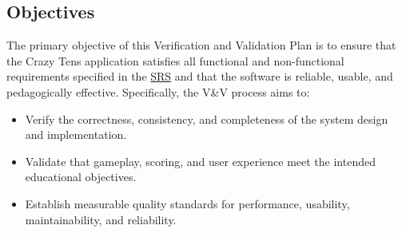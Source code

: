 \documentclass[12pt, titlepage]{article}
\begin{document}
\subsection{Objectives}

The primary objective of this Verification and Validation Plan is to ensure that the Crazy Tens application satisfies all functional and non-functional requirements specified in the \href{../SRS/SRS.pdf}{SRS} and that the software is reliable, usable, and pedagogically effective.  
Specifically, the V\&V process aims to:
\begin{itemize}
    \item Verify the correctness, consistency, and completeness of the system design and implementation.  
    \item Validate that gameplay, scoring, and user experience meet the intended educational objectives.  
    \item Establish measurable quality standards for performance, usability, maintainability, and reliability.  
\end{itemize}
\end{document}

